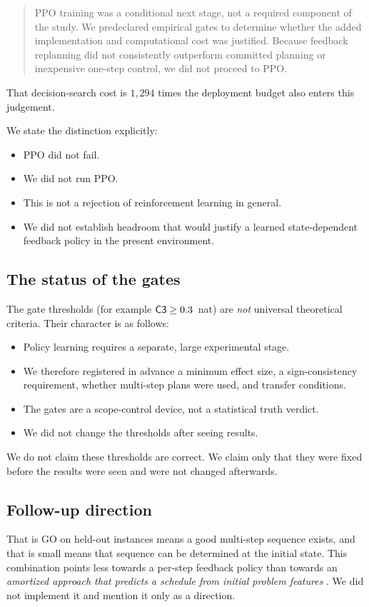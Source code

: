 \begin{quote}
PPO training was a conditional next stage, not a required component of the study. We
predeclared empirical gates to determine whether the added implementation and
computational cost was justified. Because feedback replanning did not consistently
outperform committed planning or inexpensive one-step control, we did not proceed to
PPO.
\end{quote}

That decision-search cost is $1{,}294$ times the deployment budget also enters this
judgement.

We state the distinction explicitly:

\begin{itemize}
  \item PPO did not fail.
  \item We did not run PPO.
  \item This is not a rejection of reinforcement learning in general.
  \item We did not establish headroom that would justify a learned state-dependent
        feedback policy in the present environment.
\end{itemize}

\subsection{The status of the gates}

The gate thresholds (for example $\textsf{C3} \geq 0.3$~nat) are \emph{not} universal
theoretical criteria. Their character is as follows:

\begin{itemize}
  \item Policy learning requires a separate, large experimental stage.
  \item We therefore registered in advance a minimum effect size, a sign-consistency
        requirement, whether multi-step plans were used, and transfer conditions.
  \item The gates are a scope-control device, not a statistical truth verdict.
  \item We did not change the thresholds after seeing results.
\end{itemize}

We do not claim these thresholds are correct. We claim only that they were fixed
before the results were seen and were not changed afterwards.

\subsection{Follow-up direction}
\label{sec:followup}

That  is GO on held-out instances means a good multi-step sequence exists,
and that  is small means that sequence can be determined at the initial
state. This combination points less towards a per-step feedback policy than towards
an \emph{amortized approach that predicts a schedule from initial problem features}
\citep{amos2023amortized,andrychowicz2016l2l,bae2022apo}. We did not implement it
and mention it only as a direction.
